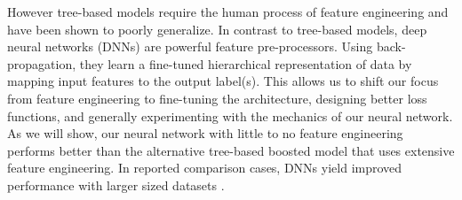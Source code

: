 However tree-based models require the human process of feature engineering and have been shown \citep{bengio2010decision} to poorly generalize.
In contrast to tree-based models, deep neural networks (DNNs) are powerful feature pre-processors. Using back-propagation, they learn a fine-tuned hierarchical representation of data by mapping input features to the output label(s). This allows us to shift our focus from feature engineering to fine-tuning the architecture, designing better loss functions, and generally experimenting with the mechanics of our neural network. As we will show, our neural network with little to no feature engineering   performs better than the alternative tree-based boosted model that uses extensive feature engineering. In reported comparison cases, DNNs yield improved performance with larger sized datasets \citep{airbnb}. 




